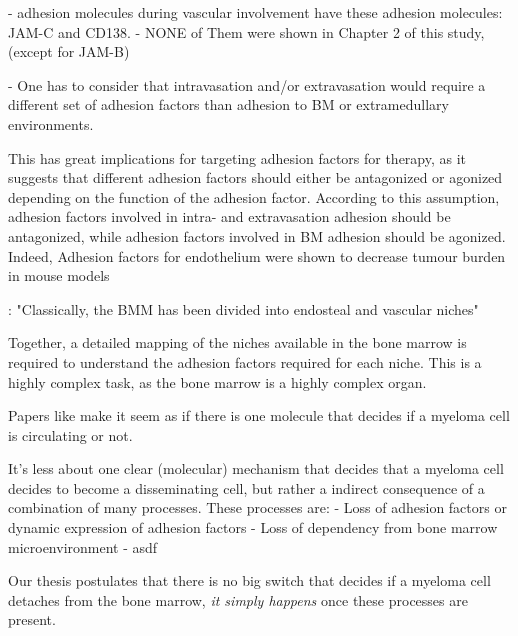 %
\label{sec:discussion_subsets_adhesion_factors}%

- adhesion molecules during vascular involvement have these adhesion molecules: JAM-C
and CD138.
- NONE of Them were shown in Chapter 2 of this study, (except for JAM-B)


- One has to consider that intravasation and/or extravasation would require a different
set of adhesion factors than adhesion to BM or extramedullary environments.

This has great implications for targeting adhesion factors for therapy, as it
suggests that different adhesion factors should either be antagonized or
agonized depending on the function of the adhesion factor. According to this
assumption, adhesion factors involved in intra- and extravasation adhesion should be
antagonized, while adhesion factors involved in BM adhesion  should be agonized. Indeed, Adhesion factors for endothelium
were shown to decrease tumour burden in mouse models \cite{asosinghUniquePathwayHoming2001a,mrozikTherapeuticTargetingNcadherin2015}

\citet{bouzerdanAdhesionMoleculesMultiple2022}: "Classically, the BMM has been
divided into endosteal and vascular niches"

Together, a detailed mapping of the niches available in the bone marrow is required
to understand the adhesion factors required for each niche. This is a highly
complex task, as the bone marrow is a highly complex organ.

%
\label{sec:discussion_many_small_switches}%

Papers like \citet{akhmetzyanovaDynamicCD138Surface2020} make it seem as if
there is one molecule that decides if a myeloma cell is circulating or not.

It's less about one clear (molecular) mechanism that decides that a myeloma cell
decides to become a disseminating cell, but rather a indirect consequence of a combination of many
processes.
These processes are:
- Loss of adhesion factors or dynamic expression of adhesion factors
- Loss of dependency from bone marrow microenvironment
- asdf

Our thesis postulates that there is no big switch that decides if a myeloma cell
detaches from the bone marrow, \emph{it simply happens} once these processes are
present.


